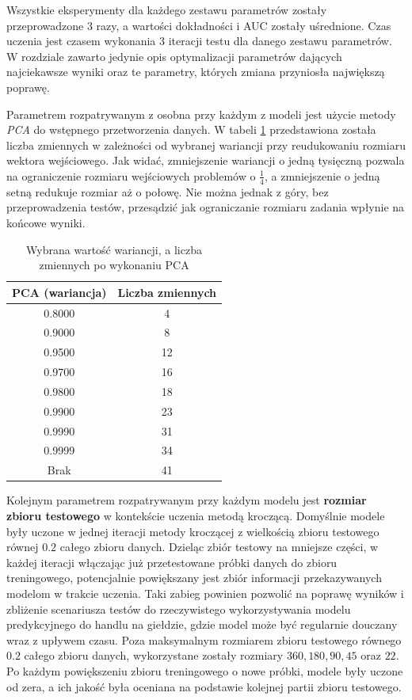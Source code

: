 \documentclass[a4paper, twoside, 11pt, openright]{article}
\begin{document}
Wszystkie eksperymenty dla każdego zestawu parametrów zostały przeprowadzone 3 razy, a wartości dokładności i AUC zostały uśrednione. Czas uczenia jest czasem wykonania 3 iteracji testu dla danego zestawu parametrów. W rozdziale zawarto jedynie opis optymalizacji parametrów dających najciekawsze wyniki oraz te parametry, których zmiana przyniosła największą poprawę.

\bigskip

Parametrem rozpatrywanym z osobna przy każdym z modeli jest użycie metody \textit{PCA} do wstępnego przetworzenia danych. W tabeli \ref{tab:pca_component_number} przedstawiona została liczba zmiennych w zależności od wybranej wariancji przy reudukowaniu rozmiaru wektora wejściowego. Jak widać, zmniejszenie wariancji o jedną tysięczną pozwala na ograniczenie rozmiaru wejściowych problemów o $\frac{1}{4}$, a zmniejszenie o jedną setną redukuje rozmiar aż o połowę. Nie można jednak z góry, bez przeprowadzenia testów, przesądzić jak ograniczanie rozmiaru zadania wpłynie na końcowe wyniki. 


\begin{table}[H]
    \centering
    \begin{tabular}{|c|c|}
    \hline
        \textbf{PCA (wariancja)} & \textbf{Liczba zmiennych} \\ \hline
        0.8000 & 4 \\ \hline 
        0.9000 & 8 \\ \hline 
        0.9500 & 12 \\ \hline 
        0.9700 & 16 \\ \hline 
        0.9800 & 18 \\ \hline 
        0.9900 & 23 \\ \hline
        0.9990 & 31 \\ \hline 
        0.9999 & 34 \\ \hline 
        Brak & 41 \\ \hline 
    \end{tabular}
    \caption{Wybrana wartość wariancji, a liczba zmiennych po wykonaniu PCA}
    \label{tab:pca_component_number}
\end{table}

\bigskip

Kolejnym parametrem rozpatrywanym przy każdym modelu jest \textbf{rozmiar zbioru testowego} w kontekście uczenia metodą kroczącą. Domyślnie modele były uczone w jednej iteracji metody kroczącej z wielkością zbioru testowego równej $0.2$ całego zbioru danych. Dzieląc zbiór testowy na mniejsze części, w każdej iteracji włączając już przetestowane próbki danych do zbioru treningowego, potencjalnie powiększany jest zbiór informacji przekazywanych modelom w trakcie uczenia. Taki zabieg  powinien pozwolić na poprawę wyników i zbliżenie scenariusza testów do rzeczywistego wykorzystywania modelu predykcyjnego do handlu na giełdzie, gdzie model może być regularnie douczany wraz z upływem czasu. Poza maksymalnym rozmiarem zbioru testowego równego $0.2$ całego zbioru danych, wykorzystane zostały rozmiary $360, 180, 90, 45$ oraz $22$. Po każdym powiększeniu zbioru treningowego o nowe próbki, modele były uczone od zera, a ich jakość była oceniana na podstawie kolejnej partii zbioru testowego.
\end{document}
